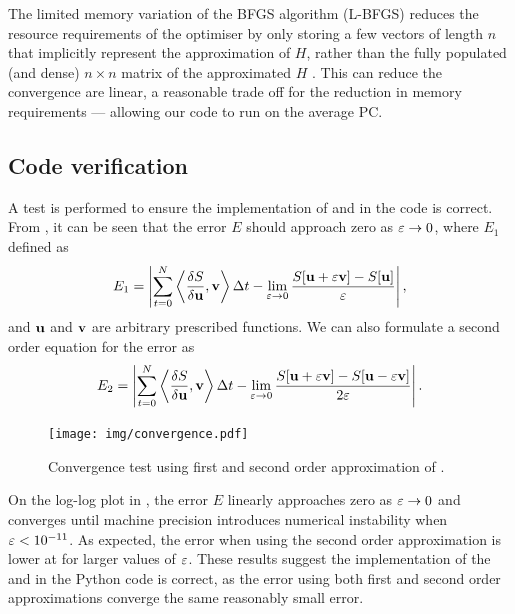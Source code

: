 \documentclass[a4paper, 12pt]{article}
\begin{document}
The limited memory variation of the BFGS algorithm (L-BFGS) reduces the resource
requirements of the optimiser by only storing a few vectors of length $n$ that
implicitly represent the approximation of $H$, rather than the fully populated (and dense)
$n\times n$ matrix of the approximated $H$ \cite{nocedal1999numerical}. This
can reduce the convergence are linear, a reasonable trade off for
the reduction in memory requirements --- allowing our code to run on the average PC.


\subsection{Code verification}
A test is performed to ensure the implementation of 
and  in the code is correct. From , it can be seen that the
error $E$ should approach zero as $\varepsilon \rightarrow 0$, where $E_1$ defined as
\begin{equation}
  \label{eq:error_o1}
  E_1 = \left| \displaystyle \sum^{N}_{t=0} \left\langle \frac{\delta S}{\delta \mathbf{u}},\mathbf{v} \right\rangle\Delta
    t - \lim_{\varepsilon \rightarrow 0} 
  \frac{S[\mathbf{u} + \varepsilon \mathbf{v}] - S[\mathbf{u}]}{\varepsilon} \right|,
\end{equation}
and  $\mathbf{u}$ and $\mathbf{v}$ are arbitrary prescribed functions.
We can also formulate a second order equation for the error as
\begin{equation}
  \label{eq:test_2nd}
   E_2 = \left\vert \displaystyle \sum^{N}_{t=0} \left\langle \frac{\delta S}{\delta \mathbf{u}},\mathbf{v} \right\rangle\Delta t - \lim_{\varepsilon \rightarrow 0} 
  \frac{S[\mathbf{u} + \varepsilon \mathbf{v}] - S[\mathbf{u} - \varepsilon \mathbf{v}] }{2\varepsilon} \right\vert.
\end{equation}
\begin{figure}[H]
  \centering
  \texttt{[image: img/convergence.pdf]}
  \caption{Convergence test using first and second order approximation of
    . }
  \label{fig:convergence}
\end{figure}

On the log-log plot in , the error $E$ linearly approaches zero as $\varepsilon \rightarrow 0$
and converges until machine precision introduces numerical instability when $\varepsilon <
10^{-11}$. As expected, the error when using the second order approximation is
lower at for larger values of $\varepsilon$.  These results suggest the
implementation of the  and  in the Python code is
correct, as the error using both first and second order approximations 
converge the same reasonably small error.

\end{document}
